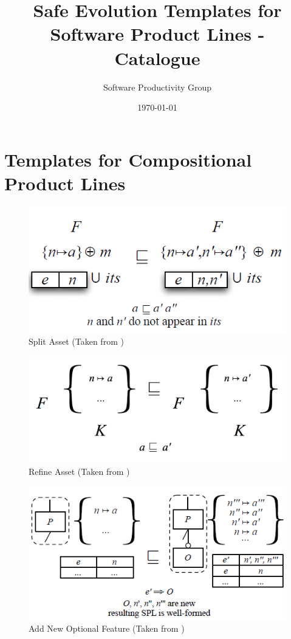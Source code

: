 \documentclass[12pt]{article}
\begin{document}
\title{Safe Evolution Templates for Software Product Lines - Catalogue} 
\author{Software Productivity Group}
\date{\today} 
\maketitle


\section{Templates for Compositional Product Lines}

\begin{figure}[H]
\centering
\includegraphics[width=1\textwidth, frame]{images/SplitAsset}
\caption{Split Asset (Taken from \cite{phdlmt})}
\end{figure}

\begin{figure}[H]
\centering
\includegraphics[width=1\textwidth, frame]{images/TemplateRefactorAsset}
\caption{Refine Asset (Taken from \cite{phdlmt})}
\end{figure}

\begin{figure}[H]
\centering
\includegraphics[width=1\textwidth, frame]{images/AddNewOptionalFeature}
\caption{Add New Optional Feature (Taken from \cite{phdlmt})}
\end{figure}
\end{document}
